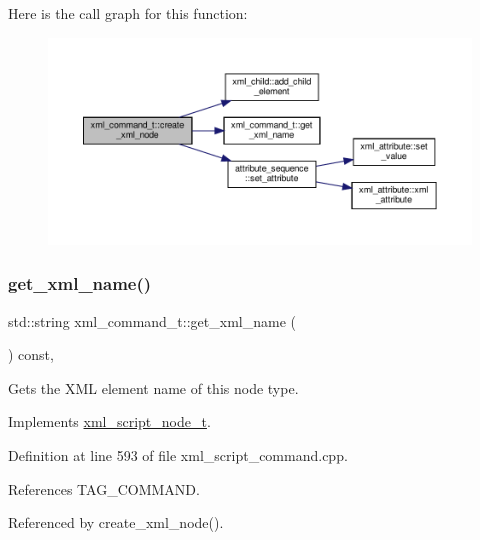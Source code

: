 Here is the call graph for this function\+:
\nopagebreak
\begin{figure}[H]
\begin{center}
\leavevmode
\includegraphics[width=350pt]{d4/db0/classxml__command__t_a8b11fb3c538442d1717e06a8f448b9ee_cgraph}
\end{center}
\end{figure}
\mbox{\label{classxml__command__t_a5d5ebe5a97c62b313c7190bb084fba87}} 
\subsubsection{\texorpdfstring{get\+\_\+xml\+\_\+name()}{get\_xml\_name()}}
{\footnotesize\ttfamily std\+::string xml\+\_\+command\+\_\+t\+::get\+\_\+xml\+\_\+name (\begin{DoxyParamCaption}{ }\end{DoxyParamCaption}) const\hspace{0.3cm}{\ttfamily [override]}, {\ttfamily [virtual]}}



Gets the X\+ML element name of this node type. 



Implements \hyperlink{classxml__script__node__t_af5815fab8924e5e4f47ba1b7266b6cb8}{xml\+\_\+script\+\_\+node\+\_\+t}.



Definition at line 593 of file xml\+\_\+script\+\_\+command.\+cpp.



References T\+A\+G\+\_\+\+C\+O\+M\+M\+A\+ND.



Referenced by create\+\_\+xml\+\_\+node().


